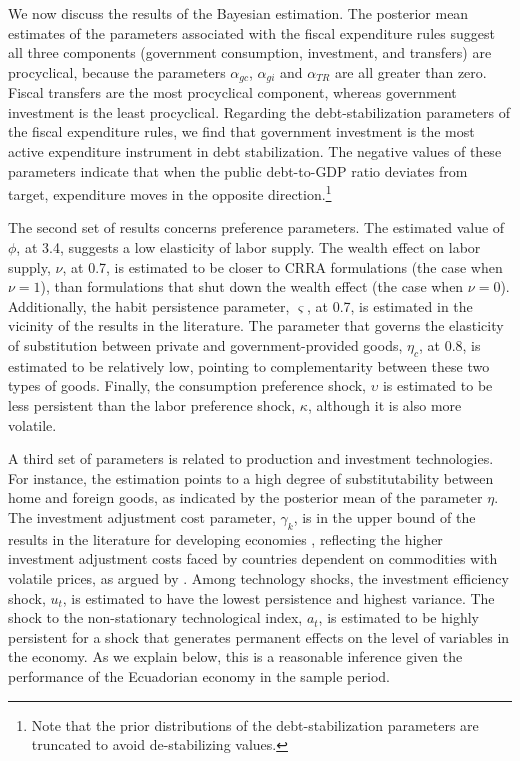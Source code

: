 \documentclass[12pt]{article}
\begin{document}
We now discuss the results of the Bayesian estimation. The posterior mean estimates of the parameters associated with the fiscal expenditure rules suggest all three components (government consumption, investment, and transfers) are procyclical, because the parameters $\alpha_{gc}$, $\alpha_{gi}$ and $\alpha_{TR}$ are all greater than zero. Fiscal transfers are the most procyclical component, whereas government investment is the least procyclical. Regarding the debt-stabilization parameters of the fiscal expenditure rules, we find that government investment is the most active expenditure instrument in debt stabilization. The negative values of these parameters indicate that when the public debt-to-GDP ratio deviates from target, expenditure moves in the opposite direction.\footnote{Note that the prior distributions of the debt-stabilization parameters are truncated to avoid de-stabilizing values.}

The second set of results concerns preference parameters. The estimated value of $\phi$, at 3.4, suggests a low elasticity of labor supply. The wealth effect on labor supply, $\nu$, at 0.7, is estimated to be closer to CRRA formulations (the case when $\nu=1$), than formulations that shut down the wealth effect (the case when $\nu=0$). Additionally, the habit persistence parameter, $\varsigma$, at 0.7, is estimated in the vicinity of the results in the literature. The parameter that governs the elasticity of substitution between private and government-provided goods, $\eta_c$, at 0.8, is estimated to be relatively low, pointing to complementarity between these two types of goods. Finally, the consumption preference shock, $\upsilon$ is estimated to be less persistent than the labor preference shock, $\kappa$, although it is also more volatile. 

A third set of parameters is related to production and investment technologies. For instance, the estimation points to a high degree of substitutability between home and foreign goods, as indicated by the posterior mean of the parameter $\eta$. The investment adjustment cost parameter, $\gamma_k$, is in the upper bound of the results in the literature for developing economies \citep[see, for example][]{sheen2016assessing, fornero2018learning, guerra2021search}, reflecting the higher investment adjustment costs faced by countries dependent on commodities with volatile prices, as argued by \citet{devlin2004managing}. Among technology shocks, the investment efficiency shock, $u_t$, is estimated to have the lowest persistence and highest variance. The shock to the non-stationary technological index, $a_t$, is estimated to be highly persistent for a shock that generates permanent effects on the level of variables in the economy. As we explain below, this is a reasonable inference given the performance of the Ecuadorian economy in the sample period.
\end{document}
